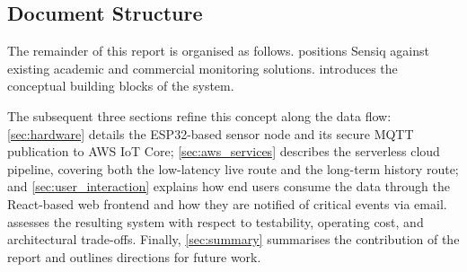 \subsection{Document Structure}\label{sec:document_structure}
The remainder of this report is organised as follows.
 positions Sensiq against existing academic and
commercial monitoring solutions.
 introduces the conceptual building blocks
of the system.

The subsequent three sections refine this concept along the data flow:
\cref{sec:hardware} details the ESP32-based sensor node and its secure
MQTT publication to AWS IoT Core;
\cref{sec:aws_services} describes the serverless cloud pipeline,
covering both the low-latency live route and the long-term history
route;
and \cref{sec:user_interaction} explains how end users consume the
data through the React-based web frontend and how they are notified of
critical events via email.
 assesses the resulting system with respect to
testability, operating cost, and architectural trade-offs.
Finally, \cref{sec:summary} summarises the contribution of the report
and outlines directions for future work.
